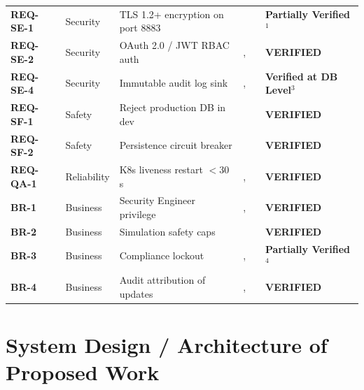 \documentclass[a4paper]{article}
\begin{document}
\begin{xltabular}{\linewidth}{@{}l >{\raggedright\arraybackslash}p{1.8cm} >{\raggedright\arraybackslash}p{2.1cm} >{\raggedright\arraybackslash}p{2.2cm} >{\raggedright\arraybackslash}p{2.4cm} X@{}}
\textbf{REQ-SE-1} & Security & TLS 1.2+ encryption on port 8883 &  & \newline{} & \textbf{Partially Verified}$^1$ \\
\textbf{REQ-SE-2} & Security & OAuth 2.0 / JWT RBAC auth & , \newline {} &  & \textbf{VERIFIED} \\
\textbf{REQ-SE-4} & Security & Immutable audit log sink & , \newline {} & \newline{} & \textbf{Verified at DB Level}$^3$ \\
\textbf{REQ-SF-1} & Safety & Reject production DB in dev &  &  & \textbf{VERIFIED} \\
\textbf{REQ-SF-2} & Safety & Persistence circuit breaker &  & \newline{} & \textbf{VERIFIED} \\
\textbf{REQ-QA-1} & Reliability & K8s liveness restart $< 30$ s & , \newline {} &  & \textbf{VERIFIED} \\
\textbf{BR-1} & Business & Security Engineer privilege & , \newline {} &  & \textbf{VERIFIED} \\
\textbf{BR-2} & Business & Simulation safety caps &  &  & \textbf{VERIFIED} \\
\textbf{BR-3} & Business & Compliance lockout & , \newline {} & \newline{} & \textbf{Partially Verified}$^4$ \\
\textbf{BR-4} & Business & Audit attribution of updates & , \newline {} &  & \textbf{VERIFIED} \\
\end{xltabular}
\endgroup

\section{System Design / Architecture of Proposed Work}
\end{document}
